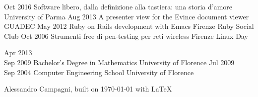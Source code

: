 \documentclass[9pt]{developercv} %
\begin{document}
\vspace{0.8cm}



\begin{entrylist}
    \entry
        {Oct 2016}
        {Software libero, dalla definizione alla tastiera: una storia d'amore}
        {University of Parma}
        {}
    \entry
        {Aug 2013}
        {A presenter view for the Evince document viewer}
        {GUADEC}
        {}
    \entry
        {May 2012}
        {Ruby on Rails development with Emacs}
        {Firenze Ruby Social Club}
        {}
    \entry
        {Oct 2006}
        {Strumenti free di pen-testing per reti wireless}
        {Firenze Linux Day}
        {}
\end{entrylist}

\vspace{0.8cm}



\begin{entrylist}
	\entry
		{Apr 2013\\Sep 2009}
		{Bachelor's Degree in Mathematics}
		{University of Florence}
		{}%
	\entry
		{Jul 2009\\Sep 2004}
		{Computer Engineering School}
		{University of Florence}
		{}%
\end{entrylist}

\vspace{0.8cm}


\vspace{3.0cm}
\hspace{10.5cm}\footnotesize{Alessandro Campagni, built on \today \hspace{0.02cm} with \LaTeX}
\end{document}
